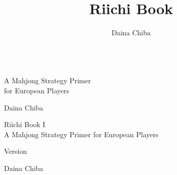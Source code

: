 \documentclass{book}
\title{Riichi Book}
\author{Daina Chiba}
\newcommand{\theversion}{7.0}
\begin{document}
\frontmatter
{}

\thispagestyle{empty}


\begin{flushleft}

\vspace*{.24\paperheight}

\begin{spacing}{2.5}
\textcolor{White}{\fontsize{2.0cm}{3.6em}\scshape Riichi Book I}\\
{\LARGE A Mahjong Strategy Primer\\for European Players}
\end{spacing}

\vspace*{.08\paperheight}
\hfill {\LARGE Daina Chiba}

\end{flushleft}

\restoregeometry


\thispagestyle{empty}
\mbox{}\newpage

\thispagestyle{empty}
\setcounter{page}{1}
\pagebreak
\onehalfspacing

\begin{flushright}

\vspace*{.18\paperheight}

\begin{spacing}{3}
{\Huge Riichi Book I}\\
{\Large A Mahjong Strategy Primer for European Players}
\end{spacing}

\vspace*{.11\textheight} 

{\Large Version }\\

\vspace*{.07\textheight} 

{\Large
Daina Chiba\\
}

\vfill

\end{flushright}
\end{document}
